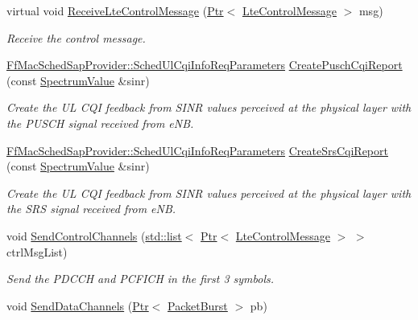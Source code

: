 \begin{DoxyCompactItemize}
virtual void \hyperlink{classns3_1_1LteEnbPhy_ae13ff5056278a107702addc9dc624409}{Receive\+Lte\+Control\+Message} (\hyperlink{classns3_1_1Ptr}{Ptr}$<$ \hyperlink{classns3_1_1LteControlMessage}{Lte\+Control\+Message} $>$ msg)
\begin{DoxyCompactList}\small\item\em Receive the control message. \end{DoxyCompactList}\item 
\hyperlink{structns3_1_1FfMacSchedSapProvider_1_1SchedUlCqiInfoReqParameters}{Ff\+Mac\+Sched\+Sap\+Provider\+::\+Sched\+Ul\+Cqi\+Info\+Req\+Parameters} \hyperlink{classns3_1_1LteEnbPhy_a1c0d9c7094c6e36c574f396e5a6270a5}{Create\+Pusch\+Cqi\+Report} (const \hyperlink{classns3_1_1SpectrumValue}{Spectrum\+Value} \&sinr)
\begin{DoxyCompactList}\small\item\em Create the UL C\+QI feedback from S\+I\+NR values perceived at the physical layer with the P\+U\+S\+CH signal received from e\+NB. \end{DoxyCompactList}\item 
\hyperlink{structns3_1_1FfMacSchedSapProvider_1_1SchedUlCqiInfoReqParameters}{Ff\+Mac\+Sched\+Sap\+Provider\+::\+Sched\+Ul\+Cqi\+Info\+Req\+Parameters} \hyperlink{classns3_1_1LteEnbPhy_a7028105291805bab644313e02429f0cc}{Create\+Srs\+Cqi\+Report} (const \hyperlink{classns3_1_1SpectrumValue}{Spectrum\+Value} \&sinr)
\begin{DoxyCompactList}\small\item\em Create the UL C\+QI feedback from S\+I\+NR values perceived at the physical layer with the S\+RS signal received from e\+NB. \end{DoxyCompactList}\item 
void \hyperlink{classns3_1_1LteEnbPhy_a9b09d7774432283838c76d867a814b13}{Send\+Control\+Channels} (\hyperlink{openflow-interface_8h_afd9bcfa176617760671b67580f536fa7}{std\+::list}$<$ \hyperlink{classns3_1_1Ptr}{Ptr}$<$ \hyperlink{classns3_1_1LteControlMessage}{Lte\+Control\+Message} $>$ $>$ ctrl\+Msg\+List)
\begin{DoxyCompactList}\small\item\em Send the P\+D\+C\+CH and P\+C\+F\+I\+CH in the first 3 symbols. \end{DoxyCompactList}\item 
void \hyperlink{classns3_1_1LteEnbPhy_a5dec1aaf78faa0221eeda08f8e0fa1b0}{Send\+Data\+Channels} (\hyperlink{classns3_1_1Ptr}{Ptr}$<$ \hyperlink{classns3_1_1PacketBurst}{Packet\+Burst} $>$ pb)

\end{DoxyCompactItemize}
